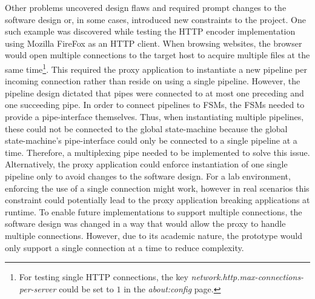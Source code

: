 Other problems uncovered design flaws and required prompt changes to the software design or, in some cases, introduced new constraints to the project. One such example was discovered while testing the \ac{HTTP} encoder implementation using Mozilla FireFox as an \ac{HTTP} client. When browsing websites, the browser would open multiple connections to the target host to acquire multiple files at the same time\footnote{For testing single \ac{HTTP} connections, the key \emph{network.http.max-connections-per-server} could be set to $1$ in the \emph{about:config} page.}. This required the proxy application to instantiate a new pipeline per incoming connection rather than reside on using a single pipeline. However, the pipeline design dictated that pipes were connected to at most one preceding and one succeeding pipe. In order to connect pipelines to \acp{FSM}, the \acp{FSM} needed to provide a pipe-interface themselves. Thus, when instantiating multiple pipelines, these could not be connected to the global state-machine because the global state-machine's pipe-interface could only be connected to a single pipeline at a time. Therefore, a multiplexing pipe needed to be implemented to solve this issue. Alternatively, the proxy application could enforce instantiation of one single pipeline only to avoid changes to the software design. For a lab environment, enforcing the use of a single connection might work, however in real scenarios this constraint could potentially lead to the proxy application breaking applications at runtime.
To enable future implementations to support multiple connections, the software design was changed in a way that would allow the proxy to handle multiple connections. However, due to its academic nature, the prototype would only support a single connection at a time to reduce complexity.
